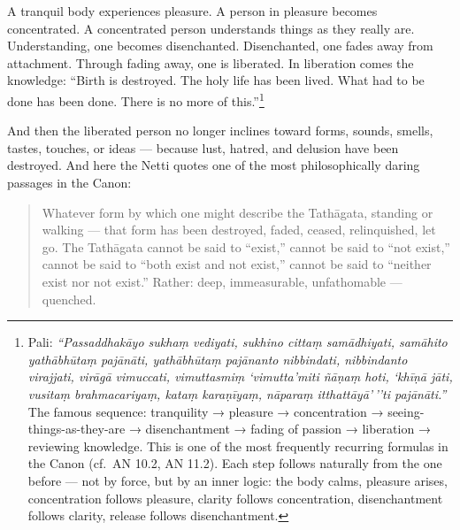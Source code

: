 A tranquil body experiences pleasure. A person in pleasure becomes concentrated. A concentrated person understands things as they really are. Understanding, one becomes disenchanted. Disenchanted, one fades away from attachment. Through fading away, one is liberated. In liberation comes the knowledge: ``Birth is destroyed. The holy life has been lived. What had to be done has been done. There is no more of this.''\footnote{Pali: \textit{``Passaddhakāyo sukhaṃ vediyati, sukhino cittaṃ samādhiyati, samāhito yathābhūtaṃ pajānāti, yathābhūtaṃ pajānanto nibbindati, nibbindanto virajjati, virāgā vimuccati, vimuttasmiṃ `vimutta'miti ñāṇaṃ hoti, `khīṇā jāti, vusitaṃ brahmacariyaṃ, kataṃ karaṇīyaṃ, nāparaṃ itthattāyā'\,''ti pajānāti.''} The famous sequence: tranquility → pleasure → concentration → seeing-things-as-they-are → disenchantment → fading of passion → liberation → reviewing knowledge. This is one of the most frequently recurring formulas in the Canon (cf.\ AN 10.2, AN 11.2). Each step follows naturally from the one before --- not by force, but by an inner logic: the body calms, pleasure arises, concentration follows pleasure, clarity follows concentration, disenchantment follows clarity, release follows disenchantment.}

And then the liberated person no longer inclines toward forms, sounds, smells, tastes, touches, or ideas --- because lust, hatred, and delusion have been destroyed. And here the Netti quotes one of the most philosophically daring passages in the Canon:

\begin{quote}
Whatever form by which one might describe the Tathāgata, standing or walking --- that form has been destroyed, faded, ceased, relinquished, let go. The Tathāgata cannot be said to ``exist,'' cannot be said to ``not exist,'' cannot be said to ``both exist and not exist,'' cannot be said to ``neither exist nor not exist.'' Rather: deep, immeasurable, unfathomable --- quenched.
\end{quote}

